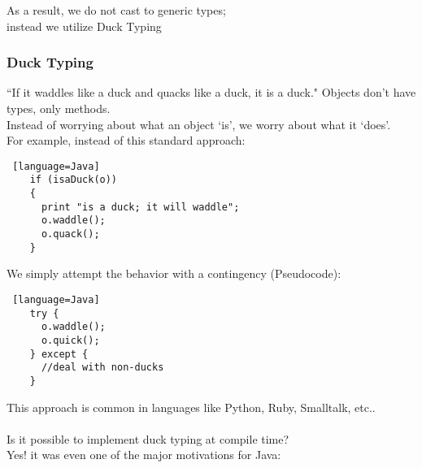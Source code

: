 \documentclass[../../lecture_notes.tex]{subfiles}
\begin{document}
\noindent As a result, we do not cast to generic types;\\
	\indent instead we utilize Duck Typing

\subsubsection*{Duck Typing}
“If it waddles like a duck and quacks like a duck, it is a duck."
Objects don’t have types, only methods.\\
Instead of worrying about what an object ‘is’, we worry about what it ‘does’.\\

\noindent For example, instead of this standard approach:
\begin{lstlisting} [language=Java]
	if (isaDuck(o))
	{
	  print "is a duck; it will waddle";
	  o.waddle(); 
	  o.quack();
	}
\end{lstlisting}
We simply attempt the behavior with a contingency (Pseudocode):
\begin{lstlisting} [language=Java]
	try {
	  o.waddle();
	  o.quick();
	} except {
	  //deal with non-ducks
	}
\end{lstlisting}
\noindent This approach is common in languages like Python, Ruby, Smalltalk, etc..\\
\\
Is it possible to implement duck typing at compile time?\\
\indent Yes! it was even one of the major motivations for Java:
\end{document}
